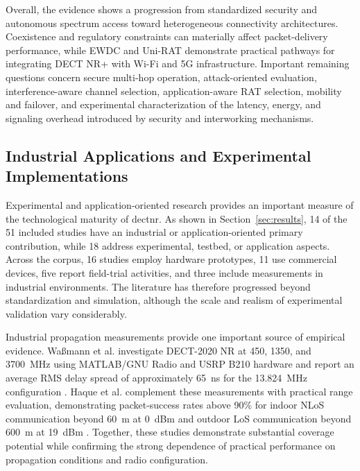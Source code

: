 Overall, the evidence shows a progression from standardized security and autonomous spectrum access toward heterogeneous connectivity architectures. Coexistence and regulatory constraints can materially affect packet-delivery performance, while EWDC and Uni-RAT demonstrate practical pathways for integrating DECT NR+ with Wi-Fi and 5G infrastructure. Important remaining questions concern secure multi-hop operation, attack-oriented evaluation, interference-aware channel selection, application-aware RAT selection, mobility and failover, and experimental characterization of the latency, energy, and signaling overhead introduced by security and interworking mechanisms.


\subsection{Industrial Applications and Experimental Implementations}
\label{subsec:industrial_experimental}

Experimental and application-oriented research provides an important measure of the technological maturity of \gls{dectnr}. As shown in Section~\ref{sec:results}, 14 of the 51 included studies have an industrial or application-oriented primary contribution, while 18 address experimental, testbed, or application aspects. Across the corpus, 16 studies employ hardware prototypes, 11 use commercial devices, five report field-trial activities, and three include measurements in industrial environments. The literature has therefore progressed beyond standardization and simulation, although the scale and realism of experimental validation vary considerably.

Industrial propagation measurements provide one important source of empirical evidence. Wa{\ss}mann et al. investigate DECT-2020 NR at 450, 1350, and 3700~MHz using MATLAB/GNU Radio and USRP B210 hardware and report an average RMS delay spread of approximately 65~ns for the 13.824~MHz configuration \cite{wassmannPerformanceDECT2020NR2024}. Haque et al. complement these measurements with practical range evaluation, demonstrating packet-success rates above 90\% for indoor NLoS communication beyond 60~m at 0~dBm and outdoor LoS communication beyond 600~m at 19~dBm \cite{haqueDECT2020NRLink2025}. Together, these studies demonstrate substantial coverage potential while confirming the strong dependence of practical performance on propagation conditions and radio configuration.

